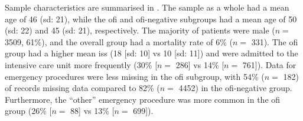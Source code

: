 \documentclass[12pt, a4paper]{article}
\begin{document}
Sample characteristics are summarised in . The sample as a whole had a mean age of 46
(\acrshort{sd}: 21), while the \acrshort{ofi} and \acrshort{ofi}-negative subgroups had a mean age of 50
(\acrshort{sd}: 22) and 45 (\acrshort{sd}: 21), respectively. The majority of patients were male ($n = $ \num{3509},
61\%), and the overall group had a mortality rate of 6\% ($n = $ \num{331}). The \acrshort{ofi} group had a higher mean
\acrshort{iss} (18 [\acrshort{sd}: 10] vs 10 [\acrshort{sd}: 11]) and were admitted to the intensive care unit more
frequently (30\% [$n = $ \num{286}] vs 14\% [$n = $ \num{761}]). Data for emergency procedures were less missing in the
\acrshort{ofi} subgroup, with 54\% ($n = $ 182) of records missing data compared to 82\% ($n = $ \num{4452}) in the
\acrshort{ofi}-negative group. Furthermore, the ``other'' emergency procedure was more common in the \acrshort{ofi}
group (26\% [$n = $ \num{88}] vs 13\% [$n = $ \num{699}]).
\end{document}
